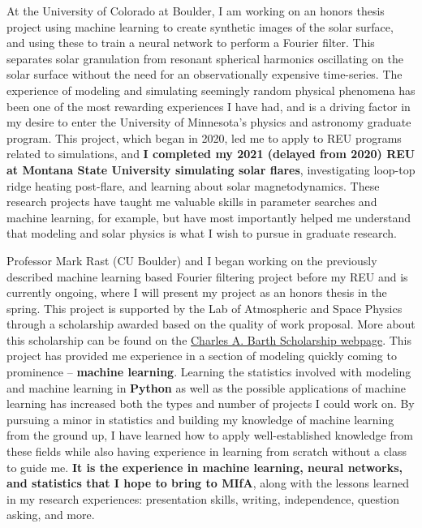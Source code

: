 \documentclass[11pt,letterpaper]{article}
\begin{document}
At the University of Colorado at Boulder, I am working on an honors thesis project using machine learning to create synthetic images of the solar surface, and using these to train a neural network to perform a Fourier filter. This separates solar granulation from resonant spherical harmonics oscillating on the solar surface without the need for an observationally expensive time-series. The experience of modeling and simulating seemingly random physical phenomena has been one of the most rewarding experiences I have had, and is a driving factor in my desire to enter the University of Minnesota's physics and astronomy graduate program. This project, which began in 2020, led me to apply to REU programs related to simulations, and \textbf{I completed my 2021 (delayed from 2020) REU at Montana State University simulating solar flares}, investigating loop-top ridge heating post-flare, and learning about solar magnetodynamics. These research projects have taught me valuable skills in parameter searches and machine learning, for example, but have most importantly helped me understand that modeling and solar physics is what I wish to pursue in graduate research.
 
Professor Mark Rast (CU Boulder) and I began working on the previously described machine learning based Fourier filtering project before my REU and is currently ongoing, where I will present my project as an honors thesis in the spring. This project is supported by the Lab of Atmospheric and Space Physics through a scholarship awarded based on the quality of work proposal. More about this scholarship can be found on the \href{https://lasp.colorado.edu/home/about/scholarships-and-fellowships/the-charles-a-barth-scholarship-in-space-research/}{Charles A. Barth Scholarship webpage}. This project has provided me experience in a section of modeling quickly coming to prominence -- \textbf{machine learning}. Learning the statistics involved with modeling and machine learning in \textbf{Python} as well as the possible applications of machine learning has increased both the types and number of projects I could work on. By pursuing a minor in statistics and building my knowledge of machine learning from the ground up, I have learned how to apply well-established knowledge from these fields while also having experience in learning from scratch without a class to guide me. \textbf{It is the experience in machine learning, neural networks, and statistics that I hope to bring to MIfA}, along with the lessons learned in my research experiences: presentation skills, writing, independence, question asking, and more.
\end{document}
